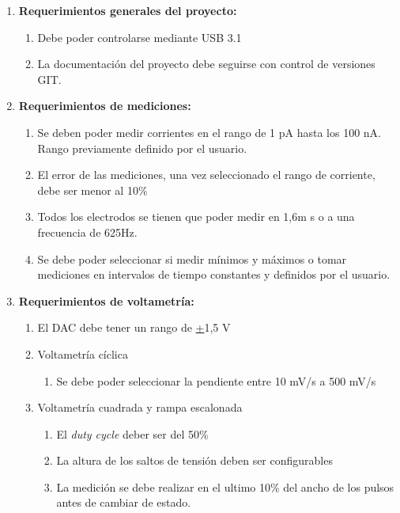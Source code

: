 \documentclass[11pt]{charter}
\begin{document}
\begin{enumerate}

\item \textbf{Requerimientos generales del proyecto:}
\begin{enumerate}
	\item Debe poder controlarse mediante USB 3.1
	\item La documentación del proyecto debe seguirse con control de versiones GIT.
\end{enumerate}

\item \textbf{Requerimientos de mediciones:}
\begin{enumerate}
	\item Se deben poder medir corrientes en el rango de 1 pA hasta los 100 nA. Rango previamente definido por el usuario.
	\item El error de las mediciones, una vez seleccionado el rango de corriente, debe ser menor al 10\%
	\item Todos los electrodos se tienen que poder medir en 1,6m s o a una frecuencia de 625Hz.
	\item Se debe poder seleccionar si medir mínimos y máximos o tomar mediciones en intervalos de tiempo constantes y definidos por el usuario.
\end{enumerate}

\item \textbf{Requerimientos de voltametría:}
\begin{enumerate}
	\item El DAC debe tener un rango de \underline{+}1,5 V
	\item Voltametría cíclica
	\begin{enumerate}
		\item Se debe poder seleccionar la pendiente entre 10 mV/s a 500 mV/s 
	\end{enumerate}
	\item Voltametría cuadrada y rampa escalonada
	\begin{enumerate}
		\item El \textit{duty cycle} deber ser del 50\%
		\item La altura de los saltos de tensión deben ser configurables
		\item La medición se debe realizar en el ultimo 10\% del ancho de los pulsos antes de cambiar de estado.
	\end{enumerate}
\end{enumerate}

\end{enumerate}
\end{document}
